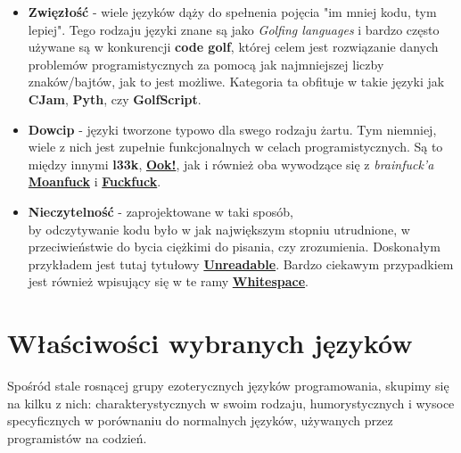 \documentclass[fleqn,10pt]{SelfArx} %
\begin{document}
\begin{itemize}
	\item \textbf{Zwięzłość} - wiele języków dąży do spełnenia pojęcia "im mniej kodu, tym lepiej". Tego rodzaju języki znane są jako \textit{Golfing languages} i bardzo często używane
	są w konkurencji \textbf{code golf}, której celem jest rozwiązanie danych problemów programistycznych za pomocą jak najmniejszej liczby znaków/bajtów, jak to jest możliwe.
	Kategoria ta obfituje w takie języki jak \textbf{CJam}, \textbf{Pyth}, czy \textbf{GolfScript}.
	\item \textbf{Dowcip} - języki tworzone typowo dla swego rodzaju żartu. Tym niemniej, wiele z nich jest zupełnie funkcjonalnych w celach programistycznych.
	Są to między innymi \textbf{l33k}, \underline{\textbf{Ook!}}, jak i również oba wywodzące się z \textit{brainfuck'a} \underline{\textbf{Moanfuck}} i \underline{\textbf{Fuckfuck}}.
	\item \textbf{Nieczytelność} - zaprojektowane w taki sposób,\\by odczytywanie kodu było w jak największym stopniu utrudnione, w przeciwieństwie do bycia ciężkimi do pisania, czy zrozumienia.
	Doskonałym przykładem jest tutaj tytułowy \underline{\textbf{Unreadable}}. Bardzo ciekawym przypadkiem jest również wpisujący się w te ramy \underline{\textbf{Whitespace}}.
\end{itemize}

%

\section{Właściwości wybranych języków}
Spośród stale rosnącej grupy ezoterycznych języków programowania, skupimy się na kilku z nich: charakterystycznych w swoim rodzaju, 
humorystycznych i wysoce specyficznych w porównaniu do normalnych języków, używanych przez programistów na codzień.
\end{document}
